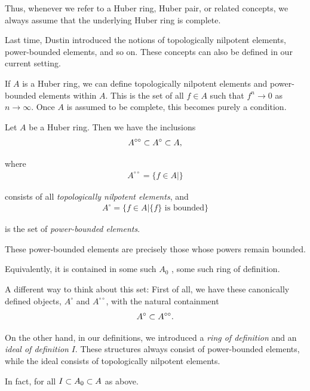 Thus, whenever we refer to a Huber ring, Huber pair, or related concepts, we always assume that the underlying Huber ring is complete.
\er

Last time, Dustin introduced the notions of topologically nilpotent elements, power-bounded elements, and so on. These concepts can also be defined in our current setting.

If $A$ is a Huber ring, we can define topologically nilpotent elements and power-bounded elements within $A$. This is the set of all $f \in A$ such that $f^n \to 0$ as $n \to \infty$. Once $A$ is assumed to be complete, this becomes purely a condition.

\bd
Let $A$ be a Huber ring. Then we have the inclusions
\begin{align*}
A^{\circ\circ} \subset A^\circ \subset A,
\end{align*}

where
\begin{align*}
A^{\circ\circ} = \{ f \in A | \}
\end{align*}

consists of all \emph{topologically nilpotent elements}, and 
\begin{align*}
A^\circ = \{ f \in A | \{ f \} \text{ is bounded} \}
\end{align*}

is the set of \emph{power-bounded elements}.
\ed

These power-bounded elements are precisely those whose powers remain bounded.

Equivalently, it is contained in some such $A_0$ , some such ring of definition.

A different way to think about this set: 
First of all, we have these canonically defined objects, $A^\circ$ and $A^{\circ\circ}$, with the natural containment
\begin{align*}
A^\circ \subset A^{\circ\circ}.
\end{align*}

On the other hand, in our definitions, we introduced a \emph{ring of definition} and an \emph{ideal of definition} $I$. These structures always consist of power-bounded elements, while the ideal consists of topologically nilpotent elements.

In fact, for all $I \subset A_0 \subset A$ as above.


